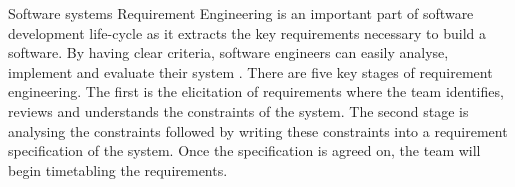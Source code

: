 \documentclass{article}
\begin{document}
	Software systems Requirement Engineering is an important part of software development life-cycle as it extracts the key requirements necessary to build a software. 
	By having clear criteria, software engineers can easily analyse, implement and evaluate their system \cite{nuseibeh2000requirements}. 
	There are five key stages of requirement engineering. The first is the elicitation of requirements where the team identifies, reviews and understands the constraints of the system. 
	The second stage is analysing the constraints followed by writing these constraints into a requirement specification of the system. 
	Once the specification is agreed on, the team will begin timetabling the requirements. 
	
\end{document}
